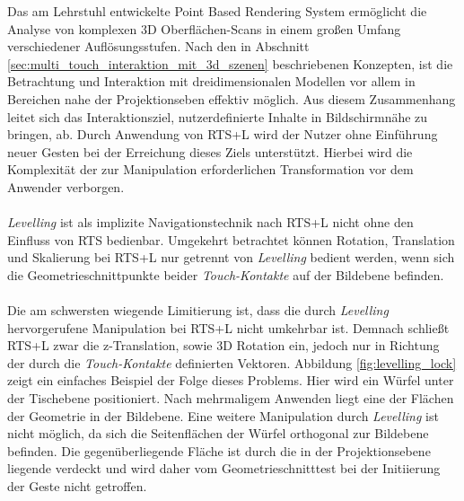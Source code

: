 Das am Lehrstuhl entwickelte Point Based Rendering  System ermöglicht die Analyse von komplexen 3D Oberflächen-Scans in einem großen Umfang verschiedener Auflösungsstufen. Nach den in Abschnitt \ref{sec:multi_touch_interaktion_mit_3d_szenen} beschriebenen Konzepten, ist die Betrachtung und Interaktion mit dreidimensionalen Modellen vor allem in Bereichen nahe der Projektionseben effektiv möglich. Aus diesem Zusammenhang leitet sich das Interaktionsziel, nutzerdefinierte Inhalte in Bildschirmnähe zu bringen, ab. Durch Anwendung von RTS+L wird der Nutzer ohne Einführung neuer Gesten bei der Erreichung dieses Ziels unterstützt. Hierbei wird die Komplexität der zur Manipulation erforderlichen Transformation vor dem Anwender verborgen.
\\\\
\emph{Levelling} ist als implizite Navigationstechnik nach RTS+L nicht ohne den Einfluss von RTS bedienbar. Umgekehrt betrachtet können Rotation, Translation und Skalierung bei RTS+L nur getrennt von \emph{Levelling} bedient werden, wenn sich die Geometrieschnittpunkte beider \emph{Touch-Kontakte} auf der Bildebene befinden. 
\\\\
Die am schwersten wiegende Limitierung ist, dass die durch \emph{Levelling} hervorgerufene Manipulation bei RTS+L nicht umkehrbar ist. Demnach schließt RTS+L zwar die z-Translation, sowie 3D Rotation ein, jedoch nur in Richtung der durch die \emph{Touch-Kontakte} definierten Vektoren. Abbildung \ref{fig:levelling_lock} zeigt ein einfaches Beispiel der Folge dieses Problems. Hier wird ein Würfel unter der Tischebene positioniert. Nach mehrmaligem Anwenden liegt eine der Flächen der Geometrie in der Bildebene. Eine weitere Manipulation durch \emph{Levelling} ist nicht möglich, da sich die Seitenflächen der Würfel orthogonal zur Bildebene befinden. Die gegenüberliegende Fläche ist durch die in der Projektionsebene liegende verdeckt und wird daher vom Geometrieschnitttest bei der Initiierung der Geste nicht getroffen.